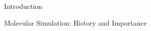 \begin{chapter}{Introduction}
\begin{section}{Molecular Simulation: History and Importance}

\end{section}
\end{chapter}
